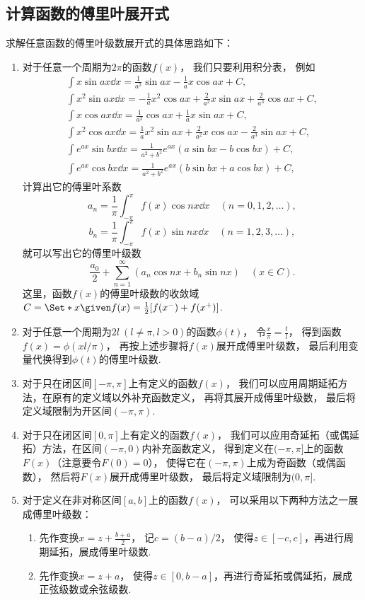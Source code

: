 \subsection*{计算函数的傅里叶展开式}
求解任意函数的傅里叶级数展开式的具体思路如下：
\begin{enumerate}
	\item 对于任意一个周期为\(2\pi\)的函数\(f(x)\)，
	我们只要利用积分表，
	例如\begin{gather*}
		\int x \sin ax \dd{x}
		= \frac{1}{a^2} \sin ax - \frac{1}{a} x \cos ax + C, \\
		\int x^2 \sin ax \dd{x}
		= -\frac{1}{a} x^2\cos ax + \frac{2}{a^2} x\sin ax + \frac{2}{a^3} \cos ax + C, \\
		\int x \cos ax \dd{x}
		= \frac{1}{a^2} \cos ax + \frac{1}{a} x \sin ax + C, \\
		\int x^2 \cos ax \dd{x}
		= \frac{1}{a} x^2 \sin ax + \frac{2}{a^2} x \cos ax - \frac{2}{a^3} \sin ax + C, \\
		\int e^{ax} \sin bx \dd{x}
		= \frac{1}{a^2+b^2} e^{ax} (a \sin bx - b \cos bx) + C, \\
		\int e^{ax} \cos bx \dd{x}
		= \frac{1}{a^2+b^2} e^{ax} (b \sin bx + a \cos bx) + C,
	\end{gather*}
	计算出它的傅里叶系数\[
		a_n = \frac{1}{\pi} \int_{-\pi}^\pi f(x) \cos nx \dd{x}
		\quad(n=0,1,2,\dotsc),
	\]\[
		b_n = \frac{1}{\pi} \int_{-\pi}^\pi f(x) \sin nx \dd{x}
		\quad(n=1,2,3,\dotsc),
	\]
	就可以写出它的傅里叶级数\[
		\frac{a_0}{2} + \sum_{n=1}^\infty (a_n \cos nx + b_n \sin nx)
		\quad(x \in C).
	\]
	这里，函数\(f(x)\)的傅里叶级数的收敛域\(C = \Set*{
		x \given
		f(x) = \frac{1}{2} [ f(x^-) + f(x^+) ]
	}\).

	\item 对于任意一个周期为\(2l\ (l\neq\pi,l>0)\)的函数\(\phi(t)\)，
	令\(\frac{x}{\pi} = \frac{t}{l}\)，
	得到函数\(f(x) = \phi(xl/\pi)\)，
	再按上述步骤将\(f(x)\)展开成傅里叶级数，
	最后利用变量代换得到\(\phi(t)\)的傅里叶级数.

	\item 对于只在闭区间\([-\pi,\pi]\)上有定义的函数\(f(x)\)，
	我们可以应用周期延拓方法，在原有的定义域以外补充函数定义，
	再将其展开成傅里叶级数，
	最后将定义域限制为开区间\((-\pi,\pi)\).

	\item 对于只在闭区间\([0,\pi]\)上有定义的函数\(f(x)\)，
	我们可以应用奇延拓（或偶延拓）方法，在区间\((-\pi,0)\)内补充函数定义，
	得到定义在\((-\pi,\pi]\)上的函数\(F(x)\)（注意要令\(F(0) = 0\)），
	使得它在\((-\pi,\pi)\)上成为奇函数（或偶函数），
	然后将\(F(x)\)展开成傅里叶级数，
	最后将定义域限制为\((0,\pi]\).

	\item 对于定义在非对称区间\([a,b]\)上的函数\(f(x)\)，
	可以采用以下两种方法之一展成傅里叶级数：
		\begin{enumerate}
			\item 先作变换\(x = z + \frac{b+a}{2}\)，
			记\(c = (b-a)/2\)，
			使得\(z\in[-c,c]\)，再进行周期延拓，展成傅里叶级数.
			\item 先作变换\(x = z + a\)，
			使得\(z\in[0,b-a]\)，再进行奇延拓或偶延拓，展成正弦级数或余弦级数.
		\end{enumerate}
\end{enumerate}
